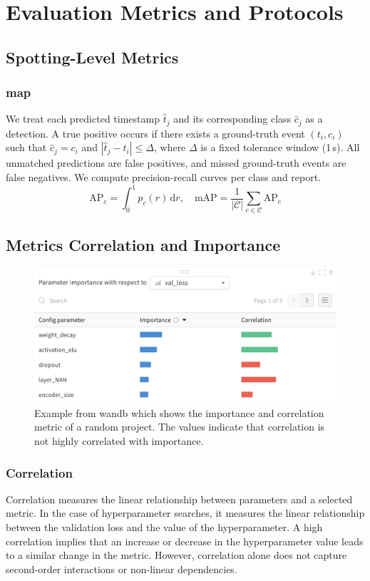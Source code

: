 \section{Evaluation Metrics and Protocols}
\label{sec:evaluation}

\subsection{Spotting-Level Metrics}
\subsubsection{\acrfull{map}}
We treat each predicted timestamp $\hat t_{j}$ and its corresponding class $\hat c_{j}$ as a detection. A true positive occurs if there exists a ground-truth event $(t_{i},c_{i})$ such that $\hat c_{j} = c_{i}$ and $|\hat t_{j} - t_{i}|\le\Delta$, where $\Delta$ is a fixed tolerance window (1\,s). All unmatched predictions are false positives, and missed ground-truth events are false negatives. We compute precision-recall curves per class and report.
\[
\mathrm{AP}_{c} = \int_{0}^{1} p_{c}(r)\,\mathrm{d}r,\quad
\mathrm{mAP} = \frac{1}{|\mathcal{C}|}\sum_{c\in\mathcal{C}}\mathrm{AP}_{c}
\]

\subsection{Metrics Correlation and Importance}

\begin{figure}
    \centering
    \includegraphics[width=0.5\linewidth]{figures/image.png}
    \caption{Example from \acrshort{wandb}\cite{wandb_parameter_importance} which shows the importance and correlation metric of a random project. The values indicate that correlation is not highly correlated with importance.}
    \label{fig:importance_v_correlation}
\end{figure}

\subsubsection{Correlation}

Correlation measures the linear relationship between parameters and a selected metric. In the case of hyperparameter searches, it measures the linear relationship between the validation loss and the value of the hyperparameter. A high correlation implies that an increase or decrease in the hyperparameter value leads to a similar change in the metric. However, correlation alone does not capture second-order interactions or non-linear dependencies.

